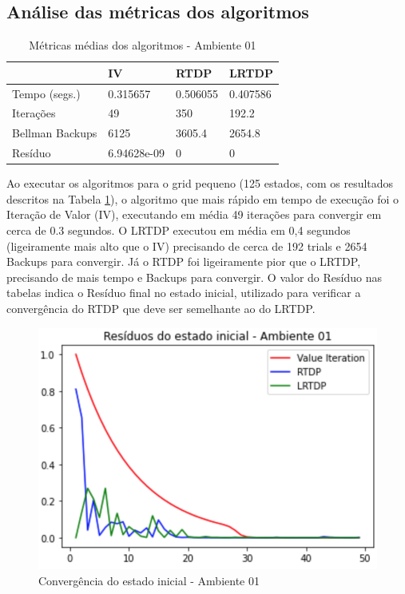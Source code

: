 \documentclass[letterpaper]{article}
\begin{document}
\subsection{Análise das métricas dos algoritmos}

\begin{table}[ht]
    \caption{Métricas médias dos algoritmos - Ambiente 01}
    \label{table:mean-performance-values-env01}
    \begin{tabular}{llll}
        \toprule
        {}              &          IV &      RTDP &     LRTDP \\
        \midrule
        Tempo (segs.)   &    0.315657 &  0.506055 &  0.407586 \\
        Iterações       &          49 &       350 &     192.2 \\
        Bellman Backups &        6125 &    3605.4 &    2654.8 \\
        Resíduo         & 6.94628e-09 &         0 &         0 \\
        \bottomrule
    \end{tabular}
\end{table}

Ao executar os algoritmos para o grid pequeno (125 estados, com os resultados descritos na Tabela \ref{table:mean-performance-values-env01}), o algoritmo que mais rápido em tempo de execução foi o Iteração de Valor (IV), executando em média 49 iterações para convergir em cerca de 0.3 segundos. O LRTDP executou em média em 0,4 segundos (ligeiramente mais alto que o IV) precisando de cerca de 192 trials e 2654 Backups para convergir. Já o RTDP foi ligeiramente pior que o LRTDP, precisando de mais tempo e Backups para convergir. O valor do Resíduo nas tabelas indica o Resíduo final no estado inicial, utilizado para verificar a convergência do RTDP que deve ser semelhante ao do LRTDP.

\begin{figure}[t]
    \centering
    \includegraphics[width=0.9\columnwidth]{initial-state-convergency-01}
    \caption{Convergência do estado inicial - Ambiente 01}
    \label{fig:initial-state-convergency-01}
\end{figure}
\end{document}
